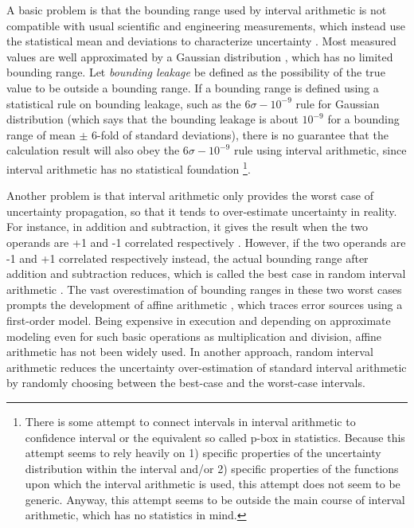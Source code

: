 \documentclass[twoside]{article}
\numberwithin{equation}{section}
\begin{document}
A basic problem is that the bounding range used by interval arithmetic is not compatible with usual scientific and engineering measurements, which instead use the statistical mean and deviations to characterize uncertainty \cite{Statistical_Methods}\cite{Precisions_Physical_Measurements}.  
Most measured values are well approximated by a Gaussian distribution \cite{Statistical_Methods}\cite{Precisions_Physical_Measurements}\cite{Probability_Statistics}, which has no limited bounding range.  
Let \emph{bounding leakage} be defined as the possibility of the true value to be outside a bounding range.  
If a bounding range is defined using a statistical rule on bounding leakage, such as the $6\sigma-10^{-9}$ rule for Gaussian distribution \cite{Probability_Statistics} (which says that the bounding leakage is about $10^{-9}$ for a bounding range of mean $\pm$ 6-fold of standard deviations), there is no guarantee that the calculation result will also obey the $6\sigma-10^{-9}$ rule using interval arithmetic, since interval arithmetic has no statistical foundation
\footnote{
There is some attempt \cite{Statistics_For_Interval_Arithmetic} to connect intervals in interval arithmetic to confidence interval or the equivalent so called p-box in statistics. 
Because this attempt seems to rely heavily on 1) specific properties of the uncertainty distribution within the interval and/or 2) specific properties of the functions upon which the interval arithmetic is used, this attempt does not seem to be generic. 
Anyway, this attempt seems to be outside the main course of interval arithmetic, which has no statistics in mind.
}.  

Another problem is that interval arithmetic only provides the worst case of uncertainty propagation, so that it tends to over-estimate uncertainty in reality.  
For instance, in addition and subtraction, it gives the result when the two operands are +1 and -1 correlated respectively \cite{Affine_Arithmetic}.  
However, if the two operands are -1 and +1 correlated respectively instead, the actual bounding range after addition and subtraction reduces, which is called the best case in random interval arithmetic \cite{Random_Interval_Arithmetic}.  
The vast overestimation of bounding ranges in these two worst cases prompts the development of affine arithmetic \cite{Affine_Arithmetic}\cite{Affine_Arithmetic_book}, which traces error sources using a first-order model.  
Being expensive in execution and depending on approximate modeling even for such basic operations as multiplication and division, affine arithmetic has not been widely used.  
In another approach, random interval arithmetic \cite{Random_Interval_Arithmetic} reduces the uncertainty over-estimation of standard interval arithmetic by randomly choosing between the best-case and the worst-case intervals.  
\end{document}
